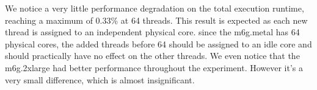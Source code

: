 \noindent
We notice a very little performance degradation on the total execution runtime, reaching a maximum 
of 0.33\% at 64 threads. This result is expected as each new thread is assigned to an independent 
physical core. since the m6g.metal has 64 physical cores, the added threads before 64 should be 
assigned to an idle core and should practically have no effect on the other threads. We even notice 
that the m6g.2xlarge had better performance throughout the experiment. However it's a very 
small difference, which is almost insignificant. 



